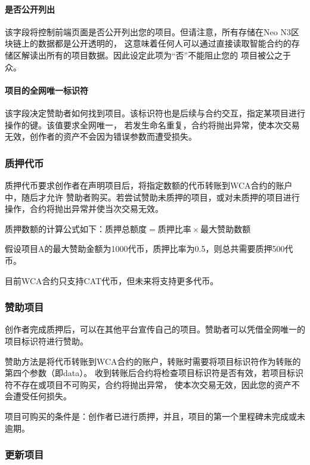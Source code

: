 \documentclass[11pt,UTF8,a4paper]{ctexart}
\begin{document}
    \paragraph{是否公开列出}

    该字段将控制前端页面是否公开列出您的项目。但请注意，所有存储在Neo N3区块链上的数据都是公开透明的，
    这意味着任何人可以通过直接读取智能合约的存储区解读出所有的项目数据。因此设定此项为“否”不能阻止您的
    项目被公之于众。

    \paragraph{项目的全网唯一标识符}

    该字段决定赞助者如何找到项目。该标识符也是后续与合约交互，指定某项目进行操作的键。该值要求全网唯一，
    若发生命名重复，合约将抛出异常，使本次交易无效，创作者的资产不会因为错误参数而遭受损失。

    \subsubsection{质押代币}

    质押代币要求创作者在声明项目后，将指定数额的代币转账到WCA合约的账户中，随后才允许
    赞助者购买。若尝试赞助未质押的项目，或对未质押的项目进行操作，合约将抛出异常并使当次交易无效。

    质押数额的计算公式如下：$\text{质押总额度} = \text{质押比率} \times \text{最大赞助数额}$

    假设项目A的最大赞助金额为1000代币，质押比率为0.5，则总共需要质押500代币。

    目前WCA合约只支持CAT代币，但未来将支持更多代币。

    \subsubsection{赞助项目}

    创作者完成质押后，可以在其他平台宣传自己的项目。赞助者可以凭借全网唯一的项目标识符进行赞助。

    赞助方法是将代币转账到WCA合约的账户，转账时需要将项目标识符作为转账的第四个参数（即data）。
    收到转账后合约将检查项目标识符是否有效，若项目标识符不存在或项目不可购买，合约将抛出异常，
    使本次交易无效，因此您的资产不会遭受任何损失。

    项目可购买的条件是：创作者已进行质押，并且，项目的第一个里程碑未完成或未逾期。

    \subsubsection{更新项目}
\end{document}
